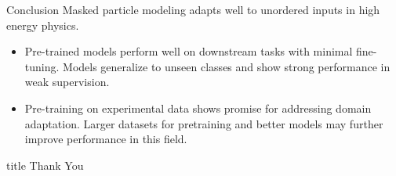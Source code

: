 \documentclass[10pt]{beamer}
\begin{document}
\begin{frame}{Conclusion}
         Masked particle modeling adapts well to unordered inputs in high
            energy physics.
    \begin{itemize}

         \item  Pre-trained models perform well on downstream tasks with minimal
                fine-tuning. Models generalize to unseen classes and show strong
                performance in weak supervision.
         \item  Pre-training on experimental data shows promise for
                addressing domain adaptation. Larger datasets for pretraining and better models may further improve
                performance in this field.


    \end{itemize}
\end{frame}



\begin{frame}
  \begin{beamercolorbox}[sep=8pt,center,shadow=false,rounded=true]{title}
  \centering \Huge
  Thank You
  \end{beamercolorbox}
\end{frame}
\end{document}
